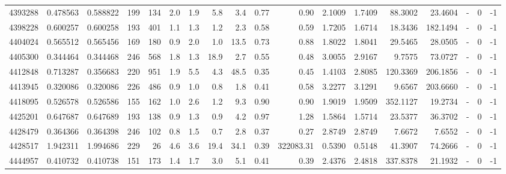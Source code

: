\begin{tabular}{rrrrrrrrrrrrrrrlrr}
   4393288 & 0.478563 &   0.588822 &  199 &  134 &      2.0 &      1.9 &     5.8 &      3.4 &       0.77 &        0.90 &  2.1009 &  1.7409 &   88.3002 &   23.4604 &             - &        0 &         -1 \\
   4398228 & 0.600257 &   0.600258 &  193 &  401 &      1.1 &      1.3 &     1.2 &      2.3 &       0.58 &        0.59 &  1.7205 &  1.6714 &   18.3436 &  182.1494 &             - &        0 &         -1 \\
   4404024 & 0.565512 &   0.565456 &  169 &  180 &      0.9 &      2.0 &     1.0 &     13.5 &       0.73 &        0.88 &  1.8022 &  1.8041 &   29.5465 &   28.0505 &             - &        0 &         -1 \\
   4405300 & 0.344464 &   0.344468 &  246 &  568 &      1.8 &      1.3 &    18.9 &      2.7 &       0.55 &        0.48 &  3.0055 &  2.9167 &    9.7575 &   73.0727 &             - &        0 &         -1 \\
   4412848 & 0.713287 &   0.356683 &  220 &  951 &      1.9 &      5.5 &     4.3 &     48.5 &       0.35 &        0.45 &  1.4103 &  2.8085 &  120.3369 &  206.1856 &             - &        0 &         -1 \\
   4413945 & 0.320086 &   0.320086 &  226 &  486 &      0.9 &      1.0 &     0.8 &      1.8 &       0.41 &        0.58 &  3.2277 &  3.1291 &    9.6567 &  203.6660 &             - &        0 &         -1 \\
   4418095 & 0.526578 &   0.526586 &  155 &  162 &      1.0 &      2.6 &     1.2 &      9.3 &       0.90 &        0.90 &  1.9019 &  1.9509 &  352.1127 &   19.2734 &             - &        0 &         -1 \\
   4425201 & 0.647687 &   0.647689 &  193 &  138 &      0.9 &      1.3 &     0.9 &      4.2 &       0.97 &        1.28 &  1.5864 &  1.5714 &   23.5377 &   36.3702 &             - &        0 &         -1 \\
   4428479 & 0.364366 &   0.364398 &  246 &  102 &      0.8 &      1.5 &     0.7 &      2.8 &       0.37 &        0.27 &  2.8749 &  2.8749 &    7.6672 &    7.6552 &             - &        0 &         -1 \\
   4428517 & 1.942311 &   1.994686 &  229 &   26 &      4.6 &      3.6 &    19.4 &     34.1 &       0.39 &   322083.31 &  0.5390 &  0.5148 &   41.3907 &   74.2666 &             - &        0 &         -1 \\
   4444957 & 0.410732 &   0.410738 &  151 &  173 &      1.4 &      1.7 &     3.0 &      5.1 &       0.41 &        0.39 &  2.4376 &  2.4818 &  337.8378 &   21.1932 &             - &        0 &         -1 \\

\end{tabular}
